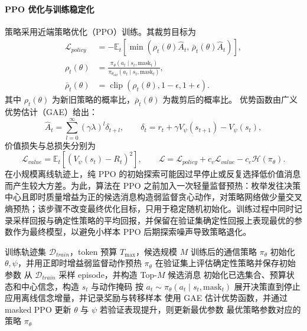 \paragraph{PPO 优化与训练稳定化}
策略采用近端策略优化（PPO）训练。其裁剪目标为
\begin{equation}
\begin{aligned}
\mathcal{L}_{policy}
&=-\mathbb{E}_t\!\left[
\min\!\left(\rho_t(\theta)\hat{A}_t,\,
\bar{\rho}_t(\theta)\hat{A}_t\right)
\right],\\
\rho_t(\theta)
&=\frac{\pi_\theta(a_t\mid s_t,\text{mask}_t)}
{\pi_{\theta_{old}}(a_t\mid s_t,\text{mask}_t)},\\
\bar{\rho}_t(\theta)
&=\operatorname{clip}\!\left(\rho_t(\theta),1-\epsilon,1+\epsilon\right).
\end{aligned}
\end{equation}
其中 $\rho_t(\theta)$ 为新旧策略的概率比，$\bar{\rho}_t(\theta)$ 为裁剪后的概率比。
优势函数由广义优势估计（GAE）给出：
\begin{equation}
\hat{A}_t=\sum_{l=0}^{\infty}(\gamma\lambda)^l\delta_{t+l},\qquad \delta_t=r_t+\gamma V_\psi(s_{t+1})-V_\psi(s_t),
\end{equation}
价值损失与总损失分别为
\begin{equation}
\mathcal{L}_{value}=\mathbb{E}_t\!\left[(V_\psi(s_t)-R_t)^2\right],\qquad
\mathcal{L}=\mathcal{L}_{policy}+c_v\mathcal{L}_{value}-c_e\mathcal{H}(\pi_\theta).
\end{equation}
在小规模离线轨迹上，纯 PPO 的初始探索可能因过早停止或反复选择低价值消息而产生较大方差。为此，算法在 PPO 之前加入一次轻量监督预热：枚举发往决策中心且即时质量增益为正的候选消息构造弱监督贪心动作，对策略网络做少量交叉熵预热；该步骤不改变最终优化目标，只用于稳定随机初始化。训练过程中同时记录采样回报与确定性策略的平均回报，并保留在验证集确定性回报上表现最优的参数作为最终模型，以避免小样本 PPO 后期探索噪声导致策略退化。

\begin{algorithm}[!tb]
\caption{EviComRL 训练过程}
\label{alg:evicom_train}
\renewcommand{\algorithmicrequire}{\textbf{输入：}}
\renewcommand{\algorithmicensure}{\textbf{输出：}}
\footnotesize
\begin{algorithmic}[1]
\REQUIRE 训练轨迹集 $\mathcal{D}_{train}$，token 预算 $T_{\max}$，候选规模 $M$
\ENSURE 训练后的通信策略 $\pi_{\theta}$
\STATE 初始化 $\theta,\psi$，并用正即时增益弱监督动作预热 $\pi_{\theta}$
\STATE 在验证集上评估确定性策略并保存初始参数
    \STATE 从 $\mathcal{D}_{train}$ 采样 episode，并构造 Top-$M$ 候选消息
        \STATE 初始化已选集合、预算状态和中心信念，构造 $s_t$ 与动作掩码
        \STATE 按 $a_t\sim\pi_{\theta}(a_t\mid s_t,\mathrm{mask}_t)$ 展开决策直到停止
        \STATE 应用离线信念增量，并记录奖励与转移样本
    \ENDFOR
    \STATE 使用 GAE 估计优势函数，并通过 masked PPO 更新 $\theta$ 与 $\psi$
    \STATE 若验证表现提升，则更新最优参数
\ENDFOR
\RETURN 最优策略参数对应的策略 $\pi_{\theta}$
\end{algorithmic}
\end{algorithm}

